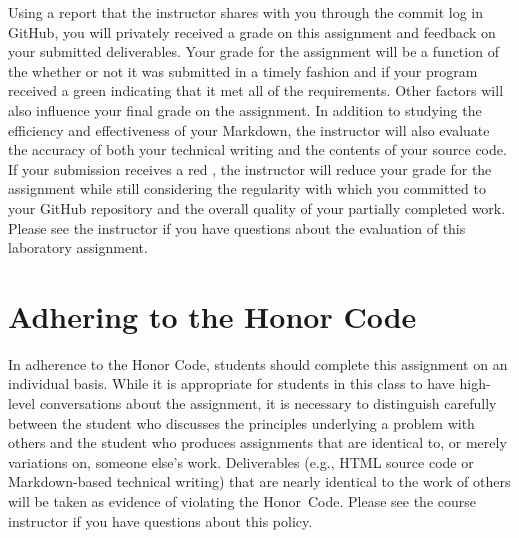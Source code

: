 \documentclass[11pt]{article}
\newcommand{\checkmark}{\ding{51}}
\newcommand{\naughtmark}{\ding{55}}
\begin{document}
Using a report that the instructor shares with you through the commit log in
GitHub, you will privately received a grade on this assignment and feedback on
your submitted deliverables. Your grade for the assignment will be a function of
the whether or not it was submitted in a timely fashion and if your program
received a green \checkmark{} indicating that it met all of the requirements.
Other factors will also influence your final grade on the assignment. In
addition to studying the efficiency and effectiveness of your Markdown, the
instructor will also evaluate the accuracy of both your technical writing and
the contents of your source code. If your submission receives a red
\naughtmark{}, the instructor will reduce your grade for the assignment while
still considering the regularity with which you committed to your GitHub
repository and the overall quality of your partially completed work. Please see
the instructor if you have questions about the evaluation of this laboratory
assignment.

\section*{Adhering to the Honor Code}

In adherence to the Honor Code, students should complete this assignment on an
individual basis. While it is appropriate for students in this class to have
high-level conversations about the assignment, it is necessary to distinguish
carefully between the student who discusses the principles underlying a problem
with others and the student who produces assignments that are identical to, or
merely variations on, someone else's work. Deliverables (e.g., HTML source code
or Markdown-based technical writing) that are nearly identical to the work of
others will be taken as evidence of violating the \mbox{Honor Code}. Please see
the course instructor if you have questions about this policy.
\end{document}

